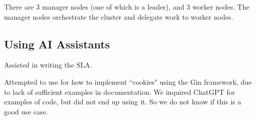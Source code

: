 There are 3 manager nodes (one of which is a leader), and 3 worker nodes. The manager nodes orchestrate the cluster and delegate work to worker nodes. 


\subsection{Using AI Assistants}

Assisted in writing the SLA.

Attempted to use for how to implement ``cookies" using the Gin framework, due to lack of sufficient examples in documentation. We inquired ChatGPT for examples of code, but did not end up using it. So we do not know if this is a good use case.

